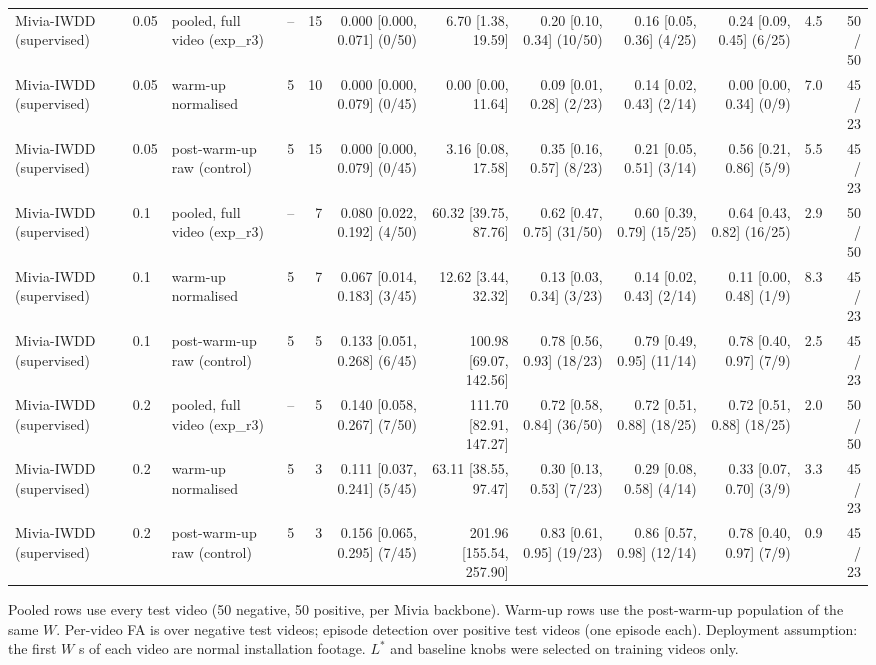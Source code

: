 \begin{table}[t]
{\begin{tabular}{llllrrrrrrrr}
Mivia-IWDD (supervised) & 0.05 & pooled, full video (exp\_r3) & -- & 15 & 0.000 [0.000, 0.071] (0/50) & 6.70 [1.38, 19.59] & 0.20 [0.10, 0.34] (10/50) & 0.16 [0.05, 0.36] (4/25) & 0.24 [0.09, 0.45] (6/25) & 4.5 & 50 / 50 \\
Mivia-IWDD (supervised) & 0.05 & warm-up normalised & 5 & 10 & 0.000 [0.000, 0.079] (0/45) & 0.00 [0.00, 11.64] & 0.09 [0.01, 0.28] (2/23) & 0.14 [0.02, 0.43] (2/14) & 0.00 [0.00, 0.34] (0/9) & 7.0 & 45 / 23 \\
Mivia-IWDD (supervised) & 0.05 & post-warm-up raw (control) & 5 & 15 & 0.000 [0.000, 0.079] (0/45) & 3.16 [0.08, 17.58] & 0.35 [0.16, 0.57] (8/23) & 0.21 [0.05, 0.51] (3/14) & 0.56 [0.21, 0.86] (5/9) & 5.5 & 45 / 23 \\
Mivia-IWDD (supervised) & 0.1 & pooled, full video (exp\_r3) & -- & 7 & 0.080 [0.022, 0.192] (4/50) & 60.32 [39.75, 87.76] & 0.62 [0.47, 0.75] (31/50) & 0.60 [0.39, 0.79] (15/25) & 0.64 [0.43, 0.82] (16/25) & 2.9 & 50 / 50 \\
Mivia-IWDD (supervised) & 0.1 & warm-up normalised & 5 & 7 & 0.067 [0.014, 0.183] (3/45) & 12.62 [3.44, 32.32] & 0.13 [0.03, 0.34] (3/23) & 0.14 [0.02, 0.43] (2/14) & 0.11 [0.00, 0.48] (1/9) & 8.3 & 45 / 23 \\
Mivia-IWDD (supervised) & 0.1 & post-warm-up raw (control) & 5 & 5 & 0.133 [0.051, 0.268] (6/45) & 100.98 [69.07, 142.56] & 0.78 [0.56, 0.93] (18/23) & 0.79 [0.49, 0.95] (11/14) & 0.78 [0.40, 0.97] (7/9) & 2.5 & 45 / 23 \\
Mivia-IWDD (supervised) & 0.2 & pooled, full video (exp\_r3) & -- & 5 & 0.140 [0.058, 0.267] (7/50) & 111.70 [82.91, 147.27] & 0.72 [0.58, 0.84] (36/50) & 0.72 [0.51, 0.88] (18/25) & 0.72 [0.51, 0.88] (18/25) & 2.0 & 50 / 50 \\
Mivia-IWDD (supervised) & 0.2 & warm-up normalised & 5 & 3 & 0.111 [0.037, 0.241] (5/45) & 63.11 [38.55, 97.47] & 0.30 [0.13, 0.53] (7/23) & 0.29 [0.08, 0.58] (4/14) & 0.33 [0.07, 0.70] (3/9) & 3.3 & 45 / 23 \\
Mivia-IWDD (supervised) & 0.2 & post-warm-up raw (control) & 5 & 3 & 0.156 [0.065, 0.295] (7/45) & 201.96 [155.54, 257.90] & 0.83 [0.61, 0.95] (19/23) & 0.86 [0.57, 0.98] (12/14) & 0.78 [0.40, 0.97] (7/9) & 0.9 & 45 / 23 \\
\bottomrule
\end{tabular}}
\begin{minipage}{\linewidth}\vspace{2pt}\footnotesize Pooled rows use every test video (50 negative, 50 positive, per Mivia backbone). Warm-up rows use the post-warm-up population of the same $W$. Per-video FA is over negative test videos; episode detection over positive test videos (one episode each). Deployment assumption: the first $W$ s of each video are normal installation footage. $L^\ast$ and baseline knobs were selected on training videos only.\end{minipage}
\end{table}
